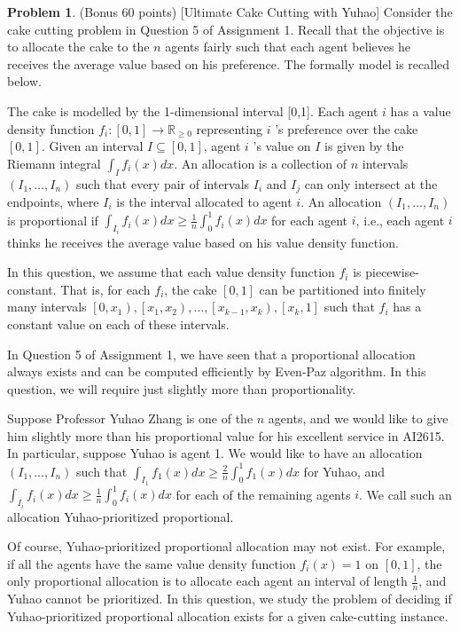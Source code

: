 \documentclass{article}
\theoremstyle{definition}
\newtheorem{prob}{Problem}
\begin{document}
	\begin{prob}
		(Bonus 60 points) [Ultimate Cake Cutting with Yuhao] Consider the cake cutting problem in Question 5 of Assignment 1. Recall that the objective is to allocate the cake to the $n$ agents fairly such that each agent believes he receives the average value based on his preference. The formally model is recalled below.
		
		The cake is modelled by the 1-dimensional interval [0,1]. Each agent $i$ has a value density function $f_{i}:[0,1] \rightarrow \mathbb{R}_{\geq 0}$ representing $i$ 's preference over the cake $[0,1]$. Given an interval $I \subseteq[0,1]$, agent $i$ 's value on $I$ is given by the Riemann integral $\int_{I} f_{i}(x) d x$. An allocation is a collection of $n$ intervals $\left(I_{1}, \ldots, I_{n}\right)$ such that every pair of intervals $I_{i}$ and $I_{j}$ can only intersect at the endpoints, where $I_{i}$ is the interval allocated to agent $i$. An allocation $\left(I_{1}, \ldots, I_{n}\right)$ is proportional if $\int_{I_{i}} f_{i}(x) d x \geq \frac{1}{n} \int_{0}^{1} f_{i}(x) d x$ for each agent $i$, i.e., each agent $i$ thinks he receives the average value based on his value density function.
		
		In this question, we assume that each value density function $f_{i}$ is piecewise-constant. That is, for each $f_{i}$, the cake $[0,1]$ can be partitioned into finitely many intervals $\left[0, x_{1}\right),\left[x_{1}, x_{2}\right), \ldots,\left[x_{k-1}, x_{k}\right),\left[x_{k}, 1\right]$ such that $f_{i}$ has a constant value on each of these intervals.
			
		In Question 5 of Assignment 1, we have seen that a proportional allocation always exists and can be computed efficiently by Even-Paz algorithm. In this question, we will require just slightly more than proportionality.
		
		Suppose Professor Yuhao Zhang is one of the $n$ agents, and we would like to give him slightly more than his proportional value for his excellent service in AI2615. In particular, suppose Yuhao is agent 1. We would like to have an allocation $\left(I_{1}, \ldots, I_{n}\right)$ such that $\int_{I_{1}} f_{1}(x) d x \geq \frac{2}{n} \int_{0}^{1} f_{1}(x) d x$ for Yuhao, and $\int_{I_{i}} f_{i}(x) d x \geq \frac{1}{n} \int_{0}^{1} f_{i}(x) d x$ for each of the remaining agents $i$. We call such an allocation Yuhao-prioritized proportional.
		
		Of course, Yuhao-prioritized proportional allocation may not exist. For example, if all the agents have the same value density function $f_{i}(x)=1$ on $[0,1]$, the only proportional allocation is to allocate each agent an interval of length $\frac{1}{n}$, and Yuhao cannot be prioritized. In this question, we study the problem of deciding if Yuhao-prioritized proportional allocation exists for a given cake-cutting instance.
		

\end{prob}
\end{document}
